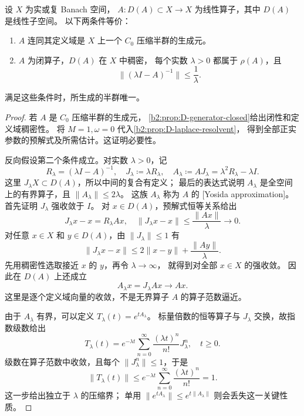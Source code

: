 \begin{theorem}\label{b2:thm:D-hille-yosida}
设 \(X\) 为实或复 Banach 空间，
\(A:D(A)\subset X\to X\) 为线性算子，其中 \(D(A)\) 是线性子空间。
以下两条件等价：
\begin{enumerate}
\item \(A\) 连同其定义域是 \(X\) 上一个 \(C_0\) 压缩半群的生成元。
\item \(A\) 为闭算子，\(D(A)\) 在 \(X\) 中稠密，
每个实数 \(\lambda>0\) 都属于 \(\rho(A)\)，且
\[
 \|(\lambda I-A)^{-1}\|\le\frac1\lambda.
\]
\end{enumerate}
满足这些条件时，所生成的半群唯一。
\end{theorem}
\begin{proof}
若 \(A\) 是 \(C_0\) 压缩半群的生成元，
\cref{b2:prop:D-generator-closed}给出闭性和定义域稠密性。
将 \(M=1,\omega=0\) 代入\cref{b2:prop:D-laplace-resolvent}，
得到全部正实参数的预解式及所需估计。这证明必要性。

反向假设第二个条件成立。对实数 \(\lambda>0\)，记
\[
 R_\lambda=(\lambda I-A)^{-1},
 \quad
 J_\lambda\coloneqq\lambda R_\lambda,
 \quad
 A_\lambda\coloneqq AJ_\lambda
          =\lambda^2R_\lambda-\lambda I.
\]
这里 \(J_\lambda X\subset D(A)\)，所以中间的复合有定义；
最后的表达式说明 \(A_\lambda\) 是全空间上的有界算子，且
\(\|A_\lambda\|\le2\lambda\)。
这族 \(A_\lambda\) 称为 \(A\) 的
[Yosida approximation]。
首先证明 \(J_\lambda\) 强收敛于 \(I\)。
对 \(x\in D(A)\)，预解式恒等关系给出
\[
 J_\lambda x-x=R_\lambda Ax,
 \quad
 \|J_\lambda x-x\|\le\frac{\|Ax\|}{\lambda}\longrightarrow0.
\]
对任意 \(x\in X\) 和 \(y\in D(A)\)，由 \(\|J_\lambda\|\le1\) 有
\[
 \|J_\lambda x-x\|
 \le2\|x-y\|+\frac{\|Ay\|}{\lambda}.
\]
先用稠密性选取接近 \(x\) 的 \(y\)，再令 \(\lambda\to\infty\)，
就得到对全部 \(x\in X\) 的强收敛。
因此在 \(D(A)\) 上还成立
\[
 A_\lambda x=J_\lambda Ax\longrightarrow Ax.
\]
这里是逐个定义域向量的收敛，不是无界算子 \(A\) 的算子范数逼近。

由于 \(A_\lambda\) 有界，可以定义 \(T_\lambda(t)=e^{tA_\lambda}\)。
标量倍数的恒等算子与 \(J_\lambda\) 交换，故指数级数给出
\[
 T_\lambda(t)=e^{-\lambda t}
   \sum_{n=0}^\infty\frac{(\lambda t)^n}{n!}J_\lambda^n,
 \quad t\ge0.
\]
级数在算子范数中收敛，且每个 \(\|J_\lambda^n\|\le1\)，于是
\[
 \|T_\lambda(t)\|
 \le e^{-\lambda t}\sum_{n=0}^\infty\frac{(\lambda t)^n}{n!}=1.
\]
这一步给出独立于 \(\lambda\) 的压缩界；
单用 \(\|e^{tA_\lambda}\|\le e^{t\|A_\lambda\|}\) 则会丢失这一关键性质。


\end{proof}
